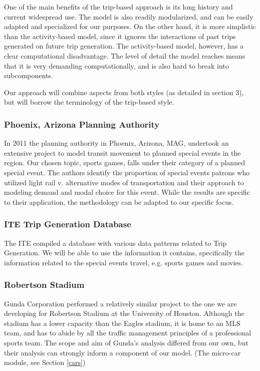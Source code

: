 One of the main benefits of the trip-based approach is its long
history and current widespread use. The model is also readily
modularized, and can be easily adapted and specialized for our
purposes. On the other hand, it is more simplistic than the
activity-based model, since it ignores the interactions of past trips
generated on future trip generation. The activity-based model,
however, has a clear computational disadvantage. The level of detail
the model reaches means that it is very demanding computationally, and
is also hard to break into subcomponents.

Our approach will combine aspects from both styles (as detailed in
section 3), but will borrow the terminology of the trip-based style.

\subsubsection{Phoenix, Arizona Planning Authority}
In 2011 the planning authority in Phoenix, Arizona, MAG, undertook an
extensive project to model transit movement to planned special events
in the region. \cite{kuppam11} Our chosen topic, sports games, falls
under their category of a planned special event. The authors identify
the proportion of special events patrons who utilized light rail
v. alternative modes of transportation and their approach to modeling
demand and modal choice for this event. While the results are specific
to their application, the methodology can be adapted to our specific
focus.

\subsubsection{ITE Trip Generation Database}
The ITE compiled a database with various data patterns related to Trip
Generation. \cite{ite08} We will be able to use the information it contains,
specifically the information related to the special events travel,
e.g. sports games and movies.

\subsubsection{Robertson Stadium}
Gunda Corporation performed a relatively similar project to the one we
are developing for Robertson Stadium at the University of
Houston.\cite{gunda} Although the stadium has a lower capacity than
the Eagles stadium, \cite{robertson-stadium} it is home to an MLS
team, and has to abide by all the traffic management principles of a
professional sports team. The scope and aim of Gunda's analysis
differed from our own, but their analysis can strongly inform a
component of our model. (The micro-car module, see Section \ref{cars})

